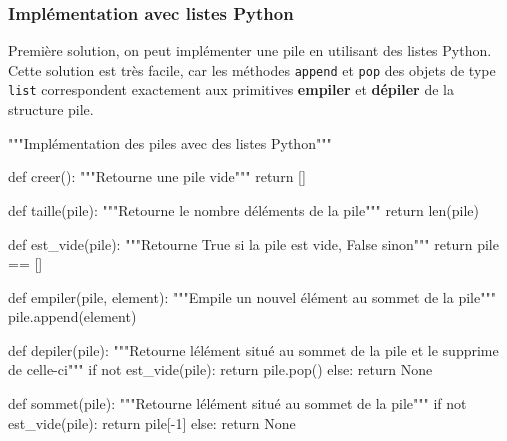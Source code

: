 \documentclass[
  a4paper,
  DIV=11,
  numbers=noendperiod]{scrartcl}
\newenvironment{Shaded}{\begin{snugshade}}{\end{snugshade}}
\newcommand{\BuiltInTok}[1]{\textcolor[rgb]{0.00,0.23,0.31}{#1}}
\newcommand{\CommentTok}[1]{\textcolor[rgb]{0.37,0.37,0.37}{#1}}
\newcommand{\ControlFlowTok}[1]{\textcolor[rgb]{0.00,0.23,0.31}{#1}}
\newcommand{\DecValTok}[1]{\textcolor[rgb]{0.68,0.00,0.00}{#1}}
\newcommand{\KeywordTok}[1]{\textcolor[rgb]{0.00,0.23,0.31}{#1}}
\newcommand{\NormalTok}[1]{\textcolor[rgb]{0.00,0.23,0.31}{#1}}
\newcommand{\OperatorTok}[1]{\textcolor[rgb]{0.37,0.37,0.37}{#1}}
\newcommand{\VariableTok}[1]{\textcolor[rgb]{0.07,0.07,0.07}{#1}}
\begin{document}
\hypertarget{impluxe9mentation-avec-listes-python}{%
\subsubsection{Implémentation avec listes
Python}\label{impluxe9mentation-avec-listes-python}}

Première solution, on peut implémenter une pile en utilisant des listes
Python. Cette solution est très facile, car les méthodes \texttt{append}
et \texttt{pop} des objets de type \texttt{list} correspondent
exactement aux primitives \textbf{empiler} et \textbf{dépiler} de la
structure pile.

\begin{Shaded}
\begin{Highlighting}[]
\CommentTok{"""Implémentation des piles avec des listes Python"""}


\KeywordTok{def}\NormalTok{ creer():}
    \CommentTok{"""Retourne une pile vide"""}
    \ControlFlowTok{return}\NormalTok{ []}


\KeywordTok{def}\NormalTok{ taille(pile):}
    \CommentTok{"""Retourne le nombre d\textquotesingle{}éléments de la pile"""}
    \ControlFlowTok{return} \BuiltInTok{len}\NormalTok{(pile)}


\KeywordTok{def}\NormalTok{ est\_vide(pile):}
    \CommentTok{"""Retourne True si la pile est vide, False sinon"""}
    \ControlFlowTok{return}\NormalTok{ pile }\OperatorTok{==}\NormalTok{ []}


\KeywordTok{def}\NormalTok{ empiler(pile, element):}
    \CommentTok{"""Empile un nouvel élément au sommet de la pile"""}
\NormalTok{    pile.append(element)}


\KeywordTok{def}\NormalTok{ depiler(pile):}
    \CommentTok{"""Retourne l\textquotesingle{}élément situé au sommet de la pile}
\CommentTok{    et le supprime de celle{-}ci"""}
    \ControlFlowTok{if} \KeywordTok{not}\NormalTok{ est\_vide(pile):}
        \ControlFlowTok{return}\NormalTok{ pile.pop()}
    \ControlFlowTok{else}\NormalTok{:}
        \ControlFlowTok{return} \VariableTok{None}


\KeywordTok{def}\NormalTok{ sommet(pile):}
    \CommentTok{"""Retourne l\textquotesingle{}élément situé au sommet de la pile"""}
    \ControlFlowTok{if} \KeywordTok{not}\NormalTok{ est\_vide(pile):}
        \ControlFlowTok{return}\NormalTok{ pile[}\OperatorTok{{-}}\DecValTok{1}\NormalTok{]}
    \ControlFlowTok{else}\NormalTok{:}
        \ControlFlowTok{return} \VariableTok{None}
\end{Highlighting}
\end{Shaded}
\end{document}
